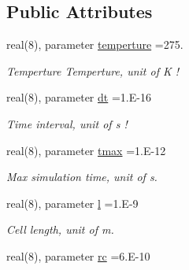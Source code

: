 \subsection*{Public Attributes}
\begin{DoxyCompactItemize}
\item 
\hypertarget{classconstants_a013de936d7df26653f268c321a9e553d}{}real(8), parameter \hyperlink{classconstants_a013de936d7df26653f268c321a9e553d}{temperture} =275.\label{classconstants_a013de936d7df26653f268c321a9e553d}

\begin{DoxyCompactList}\small\item\em Temperture Temperture, unit of K ! \end{DoxyCompactList}\item 
\hypertarget{classconstants_a551e5b157f6fcbfe1bcf321792650941}{}real(8), parameter \hyperlink{classconstants_a551e5b157f6fcbfe1bcf321792650941}{dt} =1.\+E-\/16\label{classconstants_a551e5b157f6fcbfe1bcf321792650941}

\begin{DoxyCompactList}\small\item\em Time interval, unit of s ! \end{DoxyCompactList}\item 
\hypertarget{classconstants_a15143014dbeb09a672d1ca129a7a0d68}{}real(8), parameter \hyperlink{classconstants_a15143014dbeb09a672d1ca129a7a0d68}{tmax} =1.\+E-\/12\label{classconstants_a15143014dbeb09a672d1ca129a7a0d68}

\begin{DoxyCompactList}\small\item\em Max simulation time, unit of s. \end{DoxyCompactList}\item 
\hypertarget{classconstants_a3f2a123ddf9eacacbcbb69a791a540e4}{}real(8), parameter \hyperlink{classconstants_a3f2a123ddf9eacacbcbb69a791a540e4}{l} =1.\+E-\/9\label{classconstants_a3f2a123ddf9eacacbcbb69a791a540e4}

\begin{DoxyCompactList}\small\item\em Cell length, unit of m. \end{DoxyCompactList}\item 
\hypertarget{classconstants_a9cd98cf27bc4465f53949a06e914147e}{}real(8), parameter \hyperlink{classconstants_a9cd98cf27bc4465f53949a06e914147e}{rc} =6.\+E-\/10\label{classconstants_a9cd98cf27bc4465f53949a06e914147e}


\end{DoxyCompactItemize}
